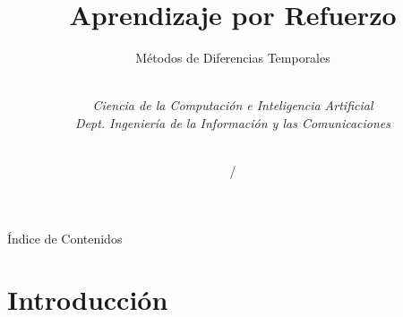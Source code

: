 \documentclass[10pt, envcountsect, handout, aspectratio=1610, hyperref={hypertexnames=true}]{beamer}
\title[Aprendizaje por Refuerzo]{Aprendizaje por Refuerzo}
\subtitle{Métodos de Diferencias Temporales} %
\author[L. D. Hernández] %
{%
	\sc{Luis Daniel Hernández Molinero }\\ %
	\textit{Ciencia de la Computación e Inteligencia Artificial}\\  %
	\textit{Dept. Ingeniería de la Información y las Comunicaciones}\\  %
	\\   %
}
\institute[DIIC]%
{
	\textit{Universidad de Murcia}
}
\date{\arabic{lastyear} / \the\year} %
\begin{document}
	











\begin{frame}[plain]
	\titlepage
\end{frame}


\begin{frame}{Índice de Contenidos}
	\tableofcontents 
	
\note{

}

\end{frame}








\section{Introducción}

\end{document}
